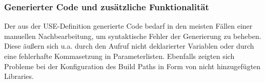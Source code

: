 \documentclass[a4paper,twoside]{article}
\begin{document}

\subsubsection{Generierter Code und zusätzliche Funktionalität}
Der aus der USE-Definition generierte Code bedarf in den meisten Fällen einer manuellen Nachbearbeitung, um syntaktische Fehler der Generierung zu beheben. Diese äußern sich u.a. durch den Aufruf nicht deklarierter Variablen oder durch eine fehlerhafte Kommasetzung in Parameterlisten. 
Ebenfalls zeigten sich Probleme bei der Konfiguration des Build Paths in Form von nicht hinzugefügten Libraries.\\
\end{document}
